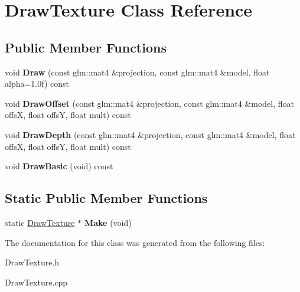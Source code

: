 \hypertarget{classDrawTexture}{\section{\-Draw\-Texture \-Class \-Reference}
\label{classDrawTexture}
}
\subsection*{\-Public \-Member \-Functions}
\begin{DoxyCompactItemize}
\item 
\hypertarget{classDrawTexture_a3a75c8540a457dde0ef60d192cc38230}{void {\bfseries \-Draw} (const glm\-::mat4 \&projection, const glm\-::mat4 \&model, float alpha=1.\-0f) const }\label{classDrawTexture_a3a75c8540a457dde0ef60d192cc38230}

\item 
\hypertarget{classDrawTexture_a6bfd29bc989d7a4e0699c6db99fdaa67}{void {\bfseries \-Draw\-Offset} (const glm\-::mat4 \&projection, const glm\-::mat4 \&model, float offs\-X, float offs\-Y, float mult) const }\label{classDrawTexture_a6bfd29bc989d7a4e0699c6db99fdaa67}

\item 
\hypertarget{classDrawTexture_acab4508f074e7b90b40a9ec810a7788f}{void {\bfseries \-Draw\-Depth} (const glm\-::mat4 \&projection, const glm\-::mat4 \&model, float offs\-X, float offs\-Y, float mult) const }\label{classDrawTexture_acab4508f074e7b90b40a9ec810a7788f}

\item 
\hypertarget{classDrawTexture_a717ebdf22de74b71b4d2fc540ed9a7bb}{void {\bfseries \-Draw\-Basic} (void) const }\label{classDrawTexture_a717ebdf22de74b71b4d2fc540ed9a7bb}

\end{DoxyCompactItemize}
\subsection*{\-Static \-Public \-Member \-Functions}
\begin{DoxyCompactItemize}
\item 
\hypertarget{classDrawTexture_a40421b54de7ae286e9017264d558d902}{static \hyperlink{classDrawTexture}{\-Draw\-Texture} $\ast$ {\bfseries \-Make} (void)}\label{classDrawTexture_a40421b54de7ae286e9017264d558d902}

\end{DoxyCompactItemize}


\-The documentation for this class was generated from the following files\-:\begin{DoxyCompactItemize}
\item 
\-Draw\-Texture.\-h\item 
\-Draw\-Texture.\-cpp\end{DoxyCompactItemize}
